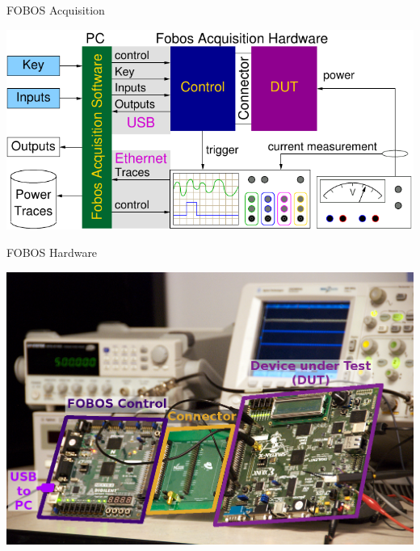 \documentclass[final]{beamer}
\begin{document}
\begin{frame}[fragile]{}
\begin{columns}[t]
\begin{column}{.31\linewidth}
      \begin{block}{FOBOS Acquisition}
        \begin{center}
          \includegraphics[scale=1.5]{../figures/fobos-dac}
        \end{center} 
       \end{block}
     
      \begin{block}{FOBOS Hardware}
        \vspace{-2ex}
        \begin{center}
          \includegraphics[width=0.9\linewidth]{../figures/FOBOS-label}
        \end{center} 
       \end{block}
     

\end{column}
\end{columns}
\end{frame}
\end{document}

